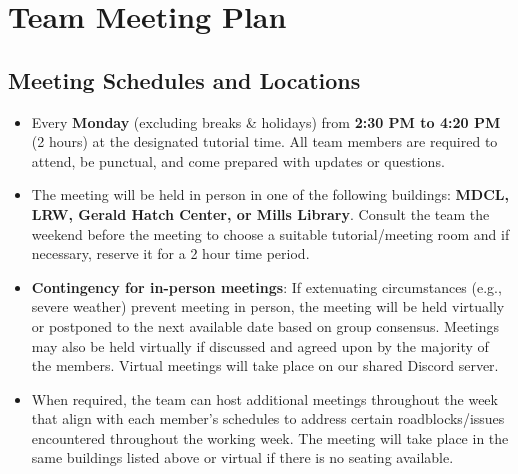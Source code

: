 \documentclass{article}
\begin{document}
\newpage

\section{Team Meeting Plan}

\subsection{Meeting Schedules and Locations}

\begin{itemize}
    \item Every \textbf{Monday} (excluding breaks \& holidays) from \textbf{2:30
    PM to 4:20 PM} (2 hours) at the designated tutorial time. All team members
    are required to attend, be punctual, and come prepared with updates or
    questions.
    
    \item The meeting will be held in person in one of the following buildings:
    \textbf{MDCL, LRW, Gerald Hatch Center, or Mills Library}. Consult the team
    the weekend before the meeting to choose a suitable tutorial/meeting room
    and if necessary, reserve it for a 2 hour time period.
    
    \item \textbf{Contingency for in-person meetings}: If extenuating
    circumstances (e.g., severe weather) prevent meeting in person, the meeting
    will be held virtually or postponed to the next available date based on
    group consensus. Meetings may also be held virtually if discussed and agreed
    upon by the majority of the members. Virtual meetings will take place on our
    shared Discord server.

    \item When required, the team can host additional meetings throughout the
    week that align with each member’s schedules to address certain
    roadblocks/issues encountered throughout the working week. The meeting will
    take place in the same buildings listed above or virtual if there is no
    seating available.
\end{itemize}
\end{document}
